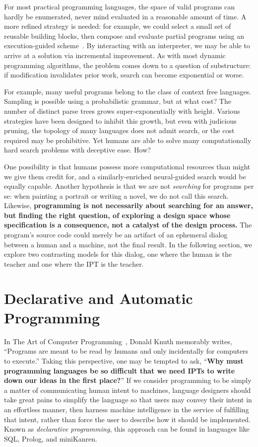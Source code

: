 \documentclass[12pt]{article}
\begin{document}
For most practical programming languages, the space of valid programs can hardly be enumerated, never mind evaluated in a reasonable amount of time. A more refined strategy is needed: for example, we could select a small set of reusable building blocks, then compose and evaluate partial programs using an execution-guided scheme~\cite{chen2018execution, wang2018execution}. By interacting with an interpreter, we may be able to arrive at a solution via incremental improvement. As with most dynamic programming algorithms, the problem comes down to a question of substructure: if modification invalidates prior work, search can become exponential or worse.

For example, many useful programs belong to the class of context free languages. Sampling is possible using a probabilistic grammar, but at what cost? The number of distinct parse trees grows super-exponentially with height. Various strategies have been designed to inhibit this growth, but even with judicious pruning, the topology of many languages does not admit search, or the cost required may be prohibitive. Yet humans are able to solve many computationally hard search problems with deceptive ease. How?

One possibility is that humans possess more computational resources than might we give them credit for, and a similarly-enriched neural-guided search would be equally capable. Another hypothesis is that we are not \textit{searching} for programs per se: when painting a portrait or writing a novel, we do not call this search. Likewise, \textbf{programming is not necessarily about searching for an answer, but finding the right question, of exploring a design space whose specification is a consequence, not a catalyst of the design process.} The program's source code could merely be an artifact of an ephemeral dialog between a human and a machine, not the final result. In the following section, we explore two contrasting models for this dialog, one where the human is the teacher and one where the IPT is the teacher.

\section{Declarative and Automatic Programming}\label{sec:automatic-and-declarative-programming}

In The Art of Computer Programming~\cite{knuth1997art}, Donald Knuth memorably writes, ``Programs are meant to be read by humans and only incidentally for computers to execute.'' Taking this perspective, one may be tempted to ask, ``\textbf{Why must programming languages be so difficult that we need IPTs to write down our ideas in the first place?}'' If we consider programming to be simply a matter of communicating human intent to machines, language designers should take great pains to simplify the language so that users may convey their intent in an effortless manner, then harness machine intelligence in the service of fulfilling that intent, rather than force the user to describe how it should be implemented. Known as \textit{declarative programming}, this approach can be found in languages like SQL, Prolog, and miniKanren.
\end{document}
